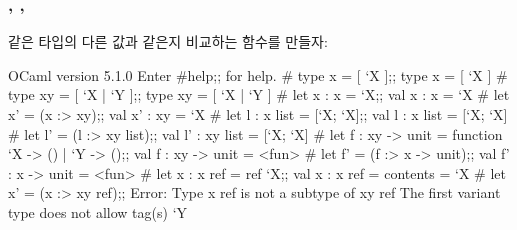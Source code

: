 \documentclass{beamer}
\begin{document}
\begin{frame}[c, fragile]
  \frametitle{, , }

  같은 타입의 다른 값과 같은지 비교하는 함수를 만들자:
  \begin{ocamlcode}
OCaml version 5.1.0
Enter #help;; for help.
# type x = [ `X ];;
type x = [ `X ]
# type xy = [ `X | `Y ];;
type xy = [ `X | `Y ]
# let x : x = `X;;
val x : x = `X
# let x' = (x :> xy);;
val x' : xy = `X
# let l : x list = [`X; `X];;
val l : x list = [`X; `X]
# let l' = (l :> xy list);;
val l' : xy list = [`X; `X]
# let f : xy -> unit = function `X -> () | `Y -> ();;
val f : xy -> unit = <fun>
# let f' = (f :> x -> unit);;
val f' : x -> unit = <fun>
# let x : x ref = ref `X;;
val x : x ref = {contents = `X}
# let x' = (x :> xy ref);;
Error: Type x ref is not a subtype of xy ref
       The first variant type does not allow tag(s) `Y
  \end{ocamlcode}
\end{frame}
\end{document}
